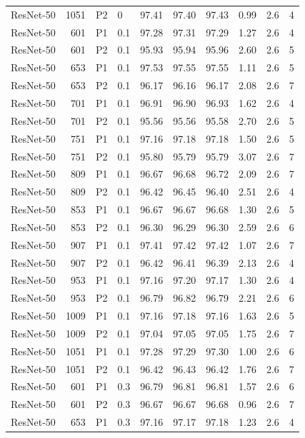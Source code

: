 {\begin{longtable}{lrllrrrrrr}
ResNet-50 & 1051 & P2 & 0 & 97.41 & 97.40 & 97.43 & 0.99 & 2.6 & 4 \\
ResNet-50 & 601 & P1 & 0.1 & 97.28 & 97.31 & 97.29 & 1.27 & 2.6 & 4 \\
ResNet-50 & 601 & P2 & 0.1 & 95.93 & 95.94 & 95.96 & 2.60 & 2.6 & 5 \\
ResNet-50 & 653 & P1 & 0.1 & 97.53 & 97.55 & 97.55 & 1.11 & 2.6 & 5 \\
ResNet-50 & 653 & P2 & 0.1 & 96.17 & 96.16 & 96.17 & 2.08 & 2.6 & 7 \\
ResNet-50 & 701 & P1 & 0.1 & 96.91 & 96.90 & 96.93 & 1.62 & 2.6 & 4 \\
ResNet-50 & 701 & P2 & 0.1 & 95.56 & 95.56 & 95.58 & 2.70 & 2.6 & 5 \\
ResNet-50 & 751 & P1 & 0.1 & 97.16 & 97.18 & 97.18 & 1.50 & 2.6 & 5 \\
ResNet-50 & 751 & P2 & 0.1 & 95.80 & 95.79 & 95.79 & 3.07 & 2.6 & 7 \\
ResNet-50 & 809 & P1 & 0.1 & 96.67 & 96.68 & 96.72 & 2.09 & 2.6 & 7 \\
ResNet-50 & 809 & P2 & 0.1 & 96.42 & 96.45 & 96.40 & 2.51 & 2.6 & 4 \\
ResNet-50 & 853 & P1 & 0.1 & 96.67 & 96.67 & 96.68 & 1.30 & 2.6 & 5 \\
ResNet-50 & 853 & P2 & 0.1 & 96.30 & 96.29 & 96.30 & 2.59 & 2.6 & 6 \\
ResNet-50 & 907 & P1 & 0.1 & 97.41 & 97.42 & 97.42 & 1.07 & 2.6 & 7 \\
ResNet-50 & 907 & P2 & 0.1 & 96.42 & 96.41 & 96.39 & 2.13 & 2.6 & 4 \\
ResNet-50 & 953 & P1 & 0.1 & 97.16 & 97.20 & 97.17 & 1.30 & 2.6 & 4 \\
ResNet-50 & 953 & P2 & 0.1 & 96.79 & 96.82 & 96.79 & 2.21 & 2.6 & 6 \\
ResNet-50 & 1009 & P1 & 0.1 & 97.16 & 97.18 & 97.16 & 1.63 & 2.6 & 5 \\
ResNet-50 & 1009 & P2 & 0.1 & 97.04 & 97.05 & 97.05 & 1.75 & 2.6 & 7 \\
ResNet-50 & 1051 & P1 & 0.1 & 97.28 & 97.29 & 97.30 & 1.00 & 2.6 & 6 \\
ResNet-50 & 1051 & P2 & 0.1 & 96.42 & 96.43 & 96.42 & 1.76 & 2.6 & 7 \\
ResNet-50 & 601 & P1 & 0.3 & 96.79 & 96.81 & 96.81 & 1.57 & 2.6 & 6 \\
ResNet-50 & 601 & P2 & 0.3 & 96.67 & 96.67 & 96.68 & 0.96 & 2.6 & 7 \\
ResNet-50 & 653 & P1 & 0.3 & 97.16 & 97.17 & 97.18 & 1.23 & 2.6 & 4 \\

\end{longtable}}
